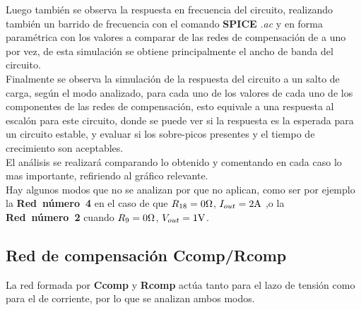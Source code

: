 Luego también se observa la respuesta en frecuencia del circuito, realizando también un barrido de frecuencia con el comando \textbf{SPICE} \textit{.ac} y en forma paramétrica con los valores a comparar de las redes de compensación de a uno por vez, de esta simulación se obtiene principalmente el ancho de banda del circuito.\\

Finalmente se observa la simulación de la respuesta del circuito a un salto de carga, según el modo analizado, para cada uno de los valores de cada uno de los componentes de las redes de compensación, esto equivale a una respuesta al escalón para este circuito, donde se puede ver si la respuesta es la esperada para un circuito estable, y evaluar si los sobre-picos presentes y el tiempo de crecimiento son aceptables.\\

El análisis se realizará comparando lo obtenido y comentando en cada caso lo mas importante, refiriendo al gráfico relevante.\\

Hay algunos modos que no se analizan por que no aplican, como ser por ejemplo la \textbf{Red~número~4} en el caso de que $R_{18} = 0 \si[per-mode=symbol]{\ohm}$, $I_{out} = 2 \si[per-mode=symbol]{\ampere}$ ,o la \textbf{Red~número~2} cuando $R_{9} = 0 \si[per-mode=symbol]{\ohm}$, $V_{out} = 1 \si[per-mode=symbol]{\volt}$.





\clearpage


\subsection{Red de compensación Ccomp/Rcomp}

La red formada por \textbf{Ccomp} y \textbf{Rcomp} actúa tanto para el lazo de tensión como para el de corriente, por lo que se analizan ambos modos.





\clearpage




